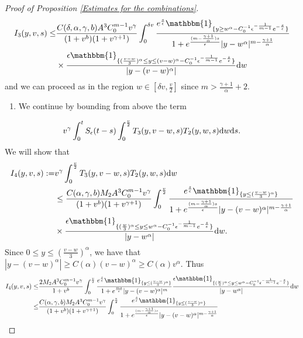 \documentclass[11pt]{article}
\numberwithin{equation}{section}
\newcommand{\der}{\textup{d}}
\begin{document}
\begin{proof}[Proof of Proposition \ref{Estimates for the combinations}]
\begin{align*}
      I_{3}(y,v,s) \leq &\frac{C(\delta,\alpha,\gamma,b)A^{3}C_{0}^{m-1} v^{\gamma}}{(1+v^{b})(1+v^{\gamma+1})}\int_{0}^{\delta v}\frac{e^{\frac{s}{\epsilon}}\mathbbm{1}_{\{y\geq w^{\alpha}-C_{0}^{-1}\epsilon^{-\frac{1}{m-1}}e^{-\frac{s}{\epsilon}}\}}}{1+e^{\frac{(m-\frac{\gamma+1}{\alpha})s}{\epsilon}}|y-w^{\alpha}|^{m-\frac{\gamma+1}{\alpha}}}\\
      &\times \frac{\epsilon\mathbbm{1}_{\{(\frac{v-w}{3})^{\alpha}\leq y\leq (v-w)^{\alpha}-C_{0}^{-1}\epsilon^{-\frac{1}{m-1}}e^{-\frac{s}{\epsilon}}\}}}{|y-(v-w)^{\alpha}|}\der  w
\end{align*}
and we can proceed as in the region $w\in [\delta v, \frac{v}{2}]$ since $m>\frac{\gamma+1}{\alpha}+2$. 

 
\begin{enumerate}
    \item[ii)] We continue by bounding from above the term 
\end{enumerate}
\begin{align}
    v^{\gamma}\int_{0}^{t}S_{\epsilon}(t-s)\int_{0}^{\frac{v}{2}} T_{3}(y,v-w,s)T_{2}(y,w,s)\der w\der s.
\end{align}
We will show that
  \begin{align*}
    I_{4}(y,v,s):= & v^{\gamma}\int_{0}^{\frac{v}{2}}  T_{3}(y,v-w,s)T_{2}(y,w,s)\der w \\
      &\leq \frac{C(\alpha,\gamma,b)M_{2}A^{3}C_{0}^{m-1} v^{\gamma}}{(1+v^{b})(1+v^{\gamma+1})}\int_{0}^{\frac{v}{2}}\frac{e^{\frac{s}{\epsilon}}\mathbbm{1}_{\{y\leq (\frac{v-w}{3})^{\alpha}\}}}{1+e^{\frac{(m-\frac{\gamma+1}{\alpha})s}{\epsilon}}|y-(v-w)^{\alpha}|^{m-\frac{\gamma+1}{\alpha}}}\\
      &\times \frac{\epsilon\mathbbm{1}_{\{(\frac{w}{3})^{\alpha}\leq y\leq w^{\alpha}-C_{0}^{-1}\epsilon^{-\frac{1}{m-1}}e^{-\frac{s}{\epsilon}}\}}}{|y-w^{\alpha}|}\der w.
  \end{align*}
  Since $0\leq y\leq (\frac{v-w}{3})^{\alpha}$, we have that $|y-(v-w)^{\alpha}|\geq C(\alpha)(v-w)^{\alpha}\geq C(\alpha)v^{\alpha}.$ Thus
   \begin{align*}
     I_{4}(y,v,s)
      \leq &\frac{2M_{2}A^{3}C_{0}^{m-1} v^{\gamma}}{1+v^{b}}\int_{0}^{\frac{v}{2}}\frac{e^{\frac{s}{\epsilon}}\mathbbm{1}_{\{y\leq (\frac{v-w}{3})^{\alpha}\}}}{1+e^{\frac{m s}{\epsilon}}|y-(v-w)^{\alpha}|^{m}}\frac{\epsilon\mathbbm{1}_{\{(\frac{w}{3})^{\alpha}\leq y\leq w^{\alpha}-C_{0}^{-1}\epsilon^{-\frac{1}{m-1}}e^{-\frac{s}{\epsilon}}\}}}{|y-w^{\alpha}|}\der w\\ \leq &\frac{C(\alpha,\gamma,b)M_{2}A^{3}C_{0}^{m-1} v^{\gamma}}{(1+v^{b})(1+v^{\gamma+1})}\int_{0}^{\frac{v}{2}}\frac{e^{\frac{s}{\epsilon}}\mathbbm{1}_{\{y\leq (\frac{v-w}{3})^{\alpha}\}}}{1+e^{\frac{(m-\frac{\gamma+1}{\alpha})s}{\epsilon}}|y-(v-w)^{\alpha}|^{m-\frac{\gamma+1}{\alpha}}}\\

\end{align*}
\end{proof}
\end{document}
